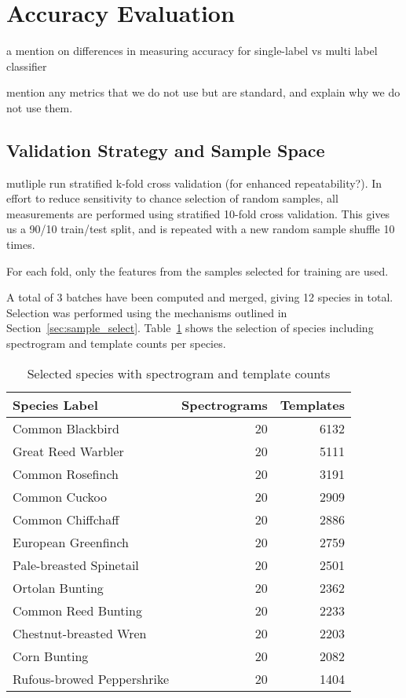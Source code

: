 \section{Accuracy Evaluation}\label{sec:acc_eval}

a mention on differences in measuring accuracy for single-label vs multi
label classifier

mention any metrics that we do not use but are standard, and explain
why we do not use them.

\subsection{Validation Strategy and Sample Space}
mutliple run stratified k-fold cross validation (for enhanced repeatability?).
In effort to reduce sensitivity to chance selection of random samples, all
measurements are performed using stratified 10-fold cross validation.
This gives us a 90/10 train/test split, and is repeated with a new random sample
shuffle 10 times.

For each fold, only the features from the samples selected for training are
used.

A total of 3 batches have been computed and merged, giving 12 species in total.
Selection was performed using the mechanisms outlined in
Section~\ref{sec:sample_select}.
Table~\ref{tbl:used_data} shows the selection of species including spectrogram
and template counts per species.

\begin{table}[!htb]
  \caption{Selected species with spectrogram and template counts}
  \label{tbl:used_data}
  \centering
  \begin{tabular}{l r r}
    Species Label & Spectrograms & Templates \\ \hline
    Common Blackbird           & 20 & 6132\\
    Great Reed Warbler         & 20 & 5111\\
    Common Rosefinch           & 20 & 3191\\
    Common Cuckoo              & 20 & 2909\\
    Common Chiffchaff          & 20 & 2886\\
    European Greenfinch        & 20 & 2759\\
    Pale-breasted Spinetail    & 20 & 2501\\
    Ortolan Bunting            & 20 & 2362\\
    Common Reed Bunting        & 20 & 2233\\
    Chestnut-breasted Wren     & 20 & 2203\\
    Corn Bunting               & 20 & 2082\\
    Rufous-browed Peppershrike & 20 & 1404
  \end{tabular}
\end{table}

